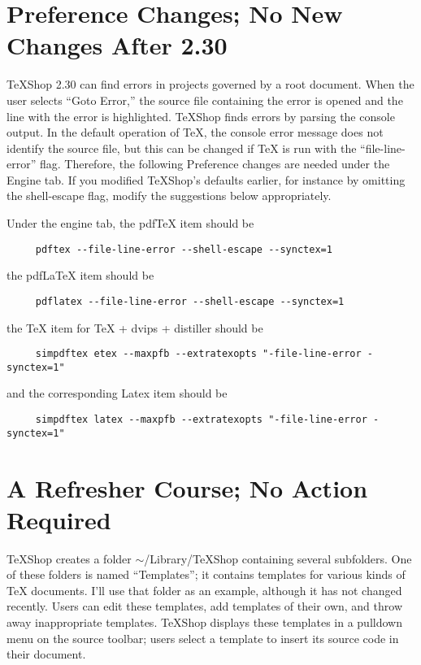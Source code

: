 \documentclass[11pt, oneside]{amsart}
\begin{document}
\section{Preference Changes;  No New Changes After 2.30}

TeXShop 2.30 can find errors in projects governed by a root document. When the user selects ``Goto Error,'' the source file containing the error is opened and the line with the error is highlighted. TeXShop finds errors by parsing the console output. In the default operation of TeX, the console error message does not identify the source file, but this can be changed if TeX is run with the ``file-line-error'' flag. Therefore, the following Preference changes are needed under the Engine tab. If you modified TeXShop's defaults earlier, for instance by omitting the shell-escape flag, modify the suggestions below appropriately.

Under the engine tab, the pdfTeX item should be
\begin{verbatim}
     pdftex --file-line-error --shell-escape --synctex=1
\end{verbatim}
the pdfLaTeX item should be
\begin{verbatim}
     pdflatex --file-line-error --shell-escape --synctex=1 
\end{verbatim}
the TeX item for TeX + dvips + distiller should be
\begin{verbatim}
     simpdftex etex --maxpfb --extratexopts "-file-line-error -synctex=1"
\end{verbatim}
and the corresponding Latex item should be
\begin{verbatim}
     simpdftex latex --maxpfb --extratexopts "-file-line-error -synctex=1"
\end{verbatim}

\section{A Refresher Course; No Action Required}

TeXShop creates a folder $\sim$/Library/TeXShop containing several subfolders. One of these folders is named ``Templates''; it  contains templates for various kinds of TeX documents. I'll use that folder as an example, although it has not changed recently. Users can edit these templates, add templates of their own, and throw away inappropriate templates. TeXShop displays these templates in a pulldown menu on the source toolbar; users select a template to insert its source code in their document.
\end{document}
